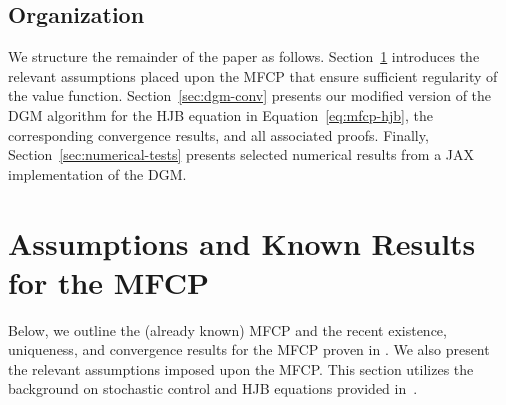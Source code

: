 \documentclass[11pt,reqno]{amsart}
\numberwithin{equation}{section}
\theoremstyle{plain}
\begin{document}
\subsection{Organization}
We structure the remainder of the paper as follows. Section~\ref{sec:hjb-mfcp-setup} introduces the relevant assumptions placed upon the MFCP that ensure sufficient regularity of the value function. Section~\ref{sec:dgm-conv} presents our modified version of the DGM algorithm for the HJB equation in Equation~\eqref{eq:mfcp-hjb}, the corresponding convergence results, and all associated proofs. Finally, Section~\ref{sec:numerical-tests} presents selected numerical results from a JAX implementation of the DGM.
\section{Assumptions and Known Results for the MFCP}
\label{sec:hjb-mfcp-setup}
Below, we outline the (already known) MFCP and the recent existence, uniqueness, and convergence results for the MFCP proven in \cite{mfcp}. We also present the relevant assumptions imposed upon the MFCP. This section utilizes the background on stochastic control and HJB equations provided in~\cite{stoch-control-text}. 
\end{document}
